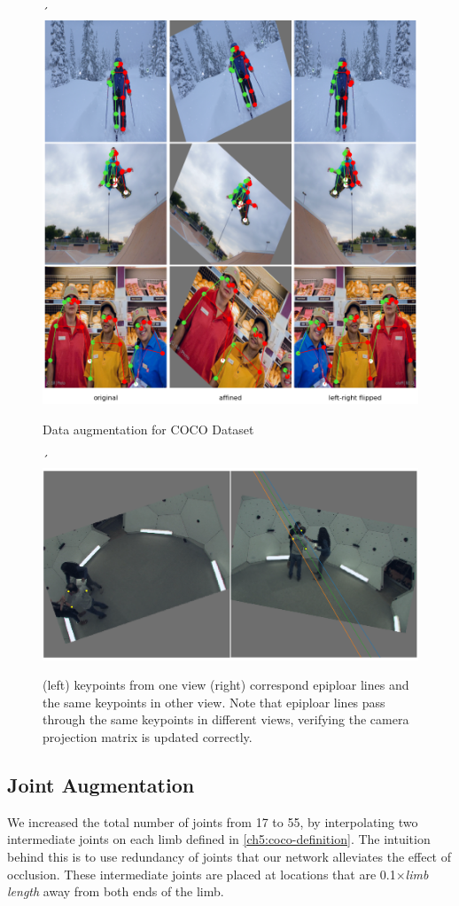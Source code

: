 \begin{figure}´
	\centering
	\includegraphics[width=0.7\columnwidth]{figures/ch5/coco-augmentation.png}
	\caption{Data augmentation for COCO Dataset} 
	\label{fig:ch5-coco-augmentation}
\end{figure}

\begin{figure}´
	\centering
	\includegraphics[width=1.0\columnwidth]{figures/ch5/panoptic-3d-epipolar-line.png}
	\caption{(left) keypoints from one view (right) correspond epiploar lines and the same keypoints in other view. Note that epiploar lines pass through the same keypoints in different views, verifying the camera projection matrix is updated correctly.} 
	\label{fig:ch5-cmu-epipolar-line}
\end{figure}

\subsection{Joint Augmentation}
We increased the total number of joints from 17 to 55, by interpolating two intermediate joints on each limb defined in \ref{ch5:coco-definition}. The intuition behind this is to use redundancy of joints that our network alleviates the effect of occlusion. These intermediate joints are placed at locations that are 0.1$\times$\textit{limb length} away from both ends of the limb.